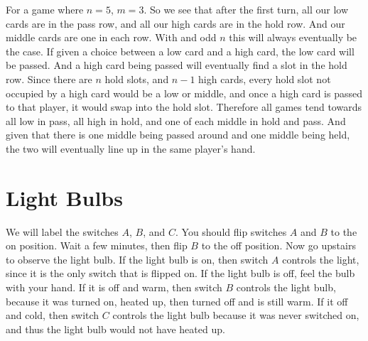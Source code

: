 \documentclass[12pt]{article}
\begin{document}
For a game where $n=5$, $m=3$. So we see that after the first turn, all our low cards are in the pass row, and all our high cards are in the hold row. And our middle cards are one in each row. With and odd $n$ this will always eventually be the case. If given a choice between a low card and a high card, the low card will be passed. And a high card being passed will eventually find a slot in the hold row. Since there are $n$ hold slots, and $n-1$ high cards, every hold slot not occupied by a high card would be a low or middle, and once a high card is passed to that player, it would swap into the hold slot. Therefore all games tend towards all low in pass, all high in hold, and one of each middle in hold and pass. And given that there is one middle being passed around and one middle being held, the two will eventually line up in the same player's hand.



\section*{Light Bulbs}
We will label the switches $A$, $B$, and $C$. You should flip switches $A$ and $B$ to the on position. Wait a few minutes, then flip $B$ to the off position. Now go upstairs to observe the light bulb. If the light bulb is on, then switch $A$ controls the light, since it is the only switch that is flipped on. If the light bulb is off, feel the bulb with your hand. If it is off and warm, then switch $B$ controls the light bulb, because it was turned on, heated up, then turned off and is still warm. If it off and cold, then switch $C$ controls the light bulb because it was never switched on, and thus the light bulb would not have heated up.
\end{document}
